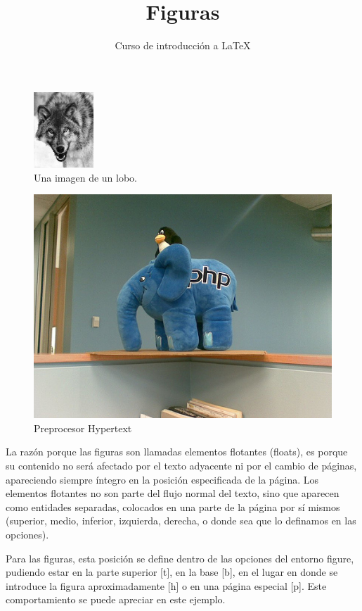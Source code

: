 \documentclass[a4paper,12pt]{article}
\title{Figuras}
\author{Curso de introducción a LaTeX}
\begin{document}
\maketitle
\begin{figure}[h] 
	\centering
	\includegraphics[width=0.2\textwidth]{fig/canis}
	\caption{Una imagen de un lobo.}
\end{figure}

\begin{figure}[h] 
	\centering
	\includegraphics[width=0.7\linewidth]{fig/php}
	\caption[PHP]{Preprocesor Hypertext}
\end{figure}


La razón porque las figuras son llamadas elementos flotantes (floats), es porque su contenido no será afectado por el texto adyacente ni por el cambio de páginas, apareciendo siempre íntegro en la posición especificada de la página. Los elementos flotantes no son parte del flujo normal del texto, sino que aparecen como entidades separadas, colocados en una parte de la página por sí mismos (superior, medio, inferior, izquierda, derecha, o donde sea que lo definamos en las opciones). 

Para las figuras, esta posición se define dentro de las opciones del entorno figure, pudiendo estar en la parte superior [t], en la base [b], en el lugar en donde se introduce la figura aproximadamente [h] o en una página especial [p]. Este comportamiento se puede apreciar en este ejemplo.
\end{document}
